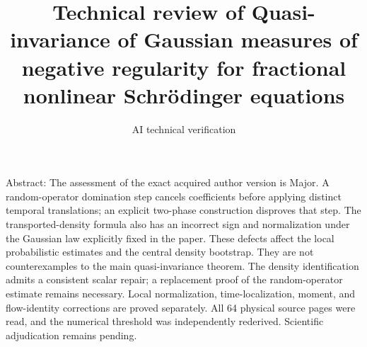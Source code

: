 \documentclass[10pt]{article}
\title{Technical review of
Quasi-invariance of Gaussian measures of negative regularity for fractional nonlinear Schrödinger equations}
\author{AI technical verification}
\date{}
\begin{document}
\maketitle
Abstract: The assessment of the exact acquired author version is Major. A random-operator domination step cancels coefficients before applying distinct temporal translations; an explicit two-phase construction disproves that step. The transported-density formula also has an incorrect sign and normalization under the Gaussian law explicitly fixed in the paper. These defects affect the local probabilistic estimates and the central density bootstrap. They are not counterexamples to the main quasi-invariance theorem. The density identification admits a consistent scalar repair; a replacement proof of the random-operator estimate remains necessary. Local normalization, time-localization, moment, and flow-identity corrections are proved separately. All 64 physical source pages were read, and the numerical threshold was independently rederived. Scientific adjudication remains pending.\par
\end{document}
